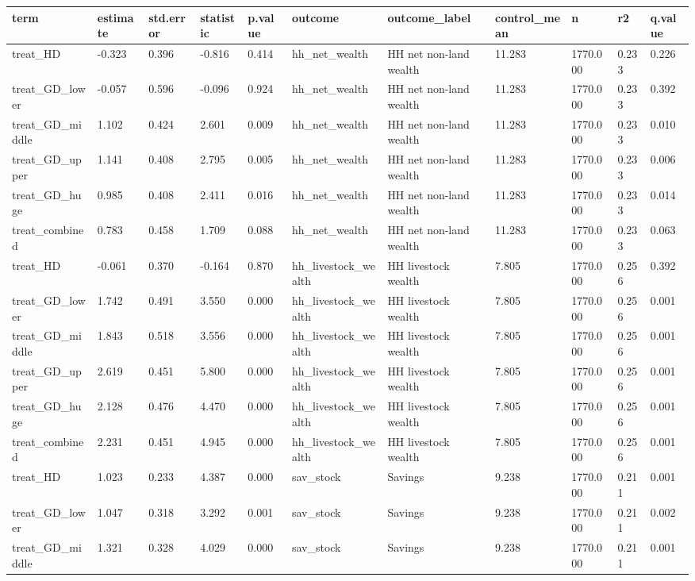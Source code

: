 \begin{tabular}{lllllllllll}
\toprule
term & estimate & std.error & statistic & p.value & outcome & outcome\_label & control\_mean & n & r2 & q.value
 \\
\midrule
treat\_HD & -0.323 & 0.396 & -0.816 & 0.414 & hh\_net\_wealth & HH net non-land wealth & 11.283 & 1770.000 & 0.233 & 0.226 \\
treat\_GD\_lower & -0.057 & 0.596 & -0.096 & 0.924 & hh\_net\_wealth & HH net non-land wealth & 11.283 & 1770.000 & 0.233 & 0.392 \\
treat\_GD\_middle & 1.102 & 0.424 & 2.601 & 0.009 & hh\_net\_wealth & HH net non-land wealth & 11.283 & 1770.000 & 0.233 & 0.010 \\
treat\_GD\_upper & 1.141 & 0.408 & 2.795 & 0.005 & hh\_net\_wealth & HH net non-land wealth & 11.283 & 1770.000 & 0.233 & 0.006 \\
treat\_GD\_huge & 0.985 & 0.408 & 2.411 & 0.016 & hh\_net\_wealth & HH net non-land wealth & 11.283 & 1770.000 & 0.233 & 0.014 \\
treat\_combined & 0.783 & 0.458 & 1.709 & 0.088 & hh\_net\_wealth & HH net non-land wealth & 11.283 & 1770.000 & 0.233 & 0.063 \\
treat\_HD & -0.061 & 0.370 & -0.164 & 0.870 & hh\_livestock\_wealth & HH livestock wealth & 7.805 & 1770.000 & 0.256 & 0.392 \\
treat\_GD\_lower & 1.742 & 0.491 & 3.550 & 0.000 & hh\_livestock\_wealth & HH livestock wealth & 7.805 & 1770.000 & 0.256 & 0.001 \\
treat\_GD\_middle & 1.843 & 0.518 & 3.556 & 0.000 & hh\_livestock\_wealth & HH livestock wealth & 7.805 & 1770.000 & 0.256 & 0.001 \\
treat\_GD\_upper & 2.619 & 0.451 & 5.800 & 0.000 & hh\_livestock\_wealth & HH livestock wealth & 7.805 & 1770.000 & 0.256 & 0.001 \\
treat\_GD\_huge & 2.128 & 0.476 & 4.470 & 0.000 & hh\_livestock\_wealth & HH livestock wealth & 7.805 & 1770.000 & 0.256 & 0.001 \\
treat\_combined & 2.231 & 0.451 & 4.945 & 0.000 & hh\_livestock\_wealth & HH livestock wealth & 7.805 & 1770.000 & 0.256 & 0.001 \\
treat\_HD & 1.023 & 0.233 & 4.387 & 0.000 & sav\_stock & Savings & 9.238 & 1770.000 & 0.211 & 0.001 \\
treat\_GD\_lower & 1.047 & 0.318 & 3.292 & 0.001 & sav\_stock & Savings & 9.238 & 1770.000 & 0.211 & 0.002 \\
treat\_GD\_middle & 1.321 & 0.328 & 4.029 & 0.000 & sav\_stock & Savings & 9.238 & 1770.000 & 0.211 & 0.001 \\

\end{tabular}
